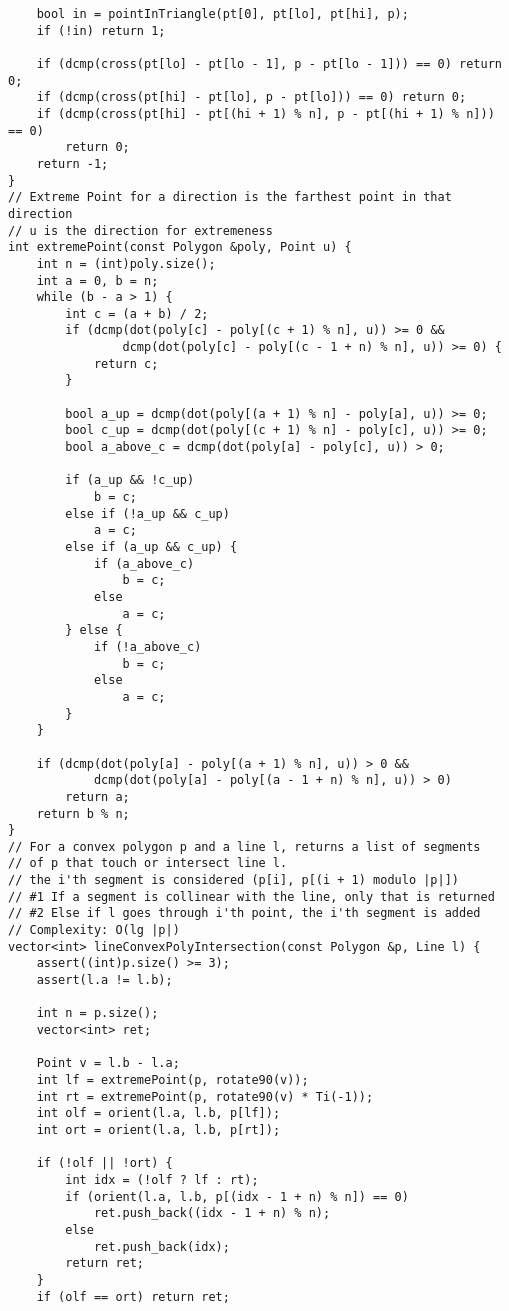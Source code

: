 \documentclass[FSZ,a4paper,onesided]{article}
\begin{document}
\begin{multicols*}{\COLS}
\begin{lstlisting}
    bool in = pointInTriangle(pt[0], pt[lo], pt[hi], p);
    if (!in) return 1;

    if (dcmp(cross(pt[lo] - pt[lo - 1], p - pt[lo - 1])) == 0) return 0;
    if (dcmp(cross(pt[hi] - pt[lo], p - pt[lo])) == 0) return 0;
    if (dcmp(cross(pt[hi] - pt[(hi + 1) % n], p - pt[(hi + 1) % n])) == 0)
        return 0;
    return -1;
}
// Extreme Point for a direction is the farthest point in that direction
// u is the direction for extremeness
int extremePoint(const Polygon &poly, Point u) {
    int n = (int)poly.size();
    int a = 0, b = n;
    while (b - a > 1) {
        int c = (a + b) / 2;
        if (dcmp(dot(poly[c] - poly[(c + 1) % n], u)) >= 0 &&
                dcmp(dot(poly[c] - poly[(c - 1 + n) % n], u)) >= 0) {
            return c;
        }

        bool a_up = dcmp(dot(poly[(a + 1) % n] - poly[a], u)) >= 0;
        bool c_up = dcmp(dot(poly[(c + 1) % n] - poly[c], u)) >= 0;
        bool a_above_c = dcmp(dot(poly[a] - poly[c], u)) > 0;

        if (a_up && !c_up)
            b = c;
        else if (!a_up && c_up)
            a = c;
        else if (a_up && c_up) {
            if (a_above_c)
                b = c;
            else
                a = c;
        } else {
            if (!a_above_c)
                b = c;
            else
                a = c;
        }
    }

    if (dcmp(dot(poly[a] - poly[(a + 1) % n], u)) > 0 &&
            dcmp(dot(poly[a] - poly[(a - 1 + n) % n], u)) > 0)
        return a;
    return b % n;
}
// For a convex polygon p and a line l, returns a list of segments
// of p that touch or intersect line l.
// the i'th segment is considered (p[i], p[(i + 1) modulo |p|])
// #1 If a segment is collinear with the line, only that is returned
// #2 Else if l goes through i'th point, the i'th segment is added
// Complexity: O(lg |p|)
vector<int> lineConvexPolyIntersection(const Polygon &p, Line l) {
    assert((int)p.size() >= 3);
    assert(l.a != l.b);

    int n = p.size();
    vector<int> ret;

    Point v = l.b - l.a;
    int lf = extremePoint(p, rotate90(v));
    int rt = extremePoint(p, rotate90(v) * Ti(-1));
    int olf = orient(l.a, l.b, p[lf]);
    int ort = orient(l.a, l.b, p[rt]);

    if (!olf || !ort) {
        int idx = (!olf ? lf : rt);
        if (orient(l.a, l.b, p[(idx - 1 + n) % n]) == 0)
            ret.push_back((idx - 1 + n) % n);
        else
            ret.push_back(idx);
        return ret;
    }
    if (olf == ort) return ret;


\end{lstlisting}
\end{multicols*}
\end{document}
